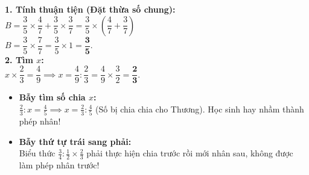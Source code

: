 \documentclass[14pt,a4paper,oneside]{extbook}
\begin{document}
\vspace{-2.5mm}
\noindent
\begin{minipage}[t]{0.49\textwidth}\vspace{0pt}
\begin{tcolorbox}[
  enhanced,
  colback=green!4!white,
  colframe=green!60!black,
  arc=2mm, boxrule=0.8pt,
  left=2mm, right=2mm, top=1.8mm, bottom=1.8mm,
  title={\footnotesize\bfseries\color{white}\faCheckCircle\ Ví dụ thực hành chuẩn mực}
]
{\footnotesize
\textbf{1. Tính thuận tiện (Đặt thừa số chung):}\\
$B = \dfrac{3}{5} \times \dfrac{4}{7} + \dfrac{3}{5} \times \dfrac{3}{7} = \dfrac{3}{5} \times \left(\dfrac{4}{7} + \dfrac{3}{7}\right)$\\
$B = \dfrac{3}{5} \times \dfrac{7}{7} = \dfrac{3}{5} \times 1 = \mathbf{\dfrac{3}{5}}$.\\
\textbf{2. Tìm $x$:}\\
$x \times \dfrac{2}{3} = \dfrac{4}{9} \implies x = \dfrac{4}{9} : \dfrac{2}{3} = \dfrac{4}{9} \times \dfrac{3}{2} = \mathbf{\dfrac{2}{3}}$.
}
\end{tcolorbox}
\end{minipage}
\hfill
\begin{minipage}[t]{0.49\textwidth}\vspace{0pt}
\begin{tcolorbox}[
  enhanced,
  colback=red!4!white,
  colframe=red!70!black,
  arc=2mm, boxrule=0.8pt,
  left=2mm, right=2mm, top=1.8mm, bottom=1.8mm,
  title={\footnotesize\bfseries\color{white}\faExclamationTriangle\ Mẹo tránh bẫy trắc nghiệm}
]
{\footnotesize
\begin{itemize}\setlength{\itemsep}{1.5pt}\setlength{\leftskip}{-2.5mm}
  \item \textbf{Bẫy tìm số chia $x$:}\\
  $\frac{2}{3} : x = \frac{4}{5} \implies x = \frac{2}{3} : \frac{4}{5}$ (Số bị chia chia cho Thương). Học sinh hay nhầm thành phép nhân!
  \item \textbf{Bẫy thứ tự trái sang phải:}\\
  Biểu thức $\frac{3}{4} : \frac{1}{2} \times \frac{2}{3}$ phải thực hiện chia trước rồi mới nhân sau, không được làm phép nhân trước!
\end{itemize}
}
\end{tcolorbox}
\end{minipage}
\end{document}
